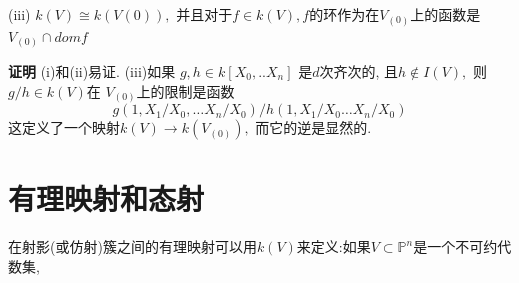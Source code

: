 \documentclass[UTF8]{book}
\begin{document}
		
		(iii) $k ( V ) \cong k ( V (0)),$ 并且对于$f \in k ( V ),$$f$的环作为在$V _{(0)}$上的函数是 $V _{(0)} \cap dom f$
		
		
		
		\textbf{证明} (i)和(ii)易证. (iii)如果 $g, h \in k [ X_{0}, . . X_{n}]$ 是$ d $次齐次的, 且$h \notin I ( V ),$ 则$g / h \in k ( V )$在 $V _{(0)}$上的限制是函数
		\begin{equation*}
		g \left(1, X _{1} / X _{0}, \ldots X _{ n } / X _{0}\right) / h \left(1, X _{1} / X _{0} \ldots X _{ n } / X _{0}\right)
		\end{equation*}
		这定义了一个映射$k ( V ) \rightarrow k \left( V _{(0)}\right),$ 而它的逆是显然的.
		
		
	\section{有理映射和态射}
		在射影(或仿射)簇之间的有理映射可以用$ k(V) $来定义:如果$ V \subset \mathbb{P}^{n} $是一个不可约代数集,
		
\end{document}
